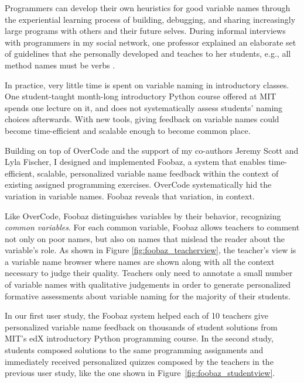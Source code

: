 Programmers can develop their own heuristics for good variable names through the experiential learning process of building, debugging, and sharing increasingly large programs with others and their future selves. During informal interviews with programmers in my social network, one professor explained an elaborate set of guidelines that she personally developed and teaches to her students, e.g., all method names must be verbs \cite{doshiconversation}.

In practice, very little time is spent on variable naming in introductory classes. One student-taught month-long introductory Python course offered at MIT spends one lecture on it, and does not systematically assess students' naming choices afterwards. With new tools, giving feedback on variable names could become time-efficient and scalable enough to become common place. 

Building on top of OverCode and the support of my co-authors Jeremy Scott and Lyla Fischer, I designed and implemented Foobaz, a system that enables time-efficient, scalable, personalized variable name feedback within the context of existing assigned programming exercises. OverCode systematically hid the variation in variable names. Foobaz reveals that variation, in context. %

Like OverCode, Foobaz distinguishes variables by their behavior, recognizing {\it common variables}. For each common variable, Foobaz allows teachers to comment not only on poor names, but also on names that mislead the reader about the variable's role. As shown in Figure \ref{fig:foobaz_teacherview}, the teacher's view is a variable name browser where names are shown along with all the context necessary to judge their quality. Teachers only need to annotate a small number of variable names with qualitative judgements in order to generate personalized formative assessments about variable naming for the majority of their students.

In our first user study, the Foobaz system helped each of 10 teachers give personalized variable name feedback on thousands of student solutions from MIT's edX introductory Python programming course. In the second study, students composed solutions to the same programming assignments and immediately received personalized quizzes composed by the teachers in the previous user study, like the one shown in Figure~\ref{fig:foobaz_studentview}.

